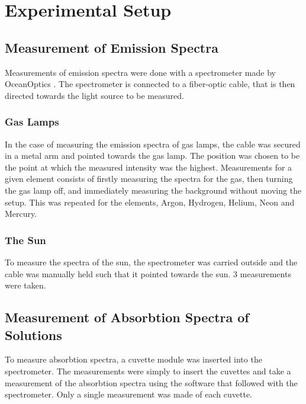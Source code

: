 \chapter{Experimental Setup}
\section{Measurement of Emission Spectra}
Measurements of emission spectra were done with a spectrometer made by OceanOptics \autocite{OcOptFlameManual2016}.
The spectrometer is connected to a fiber-optic cable, that is then directed towards the light source to be measured.
\subsection{Gas Lamps}
In the case of measuring the emission spectra of gas lamps\autocite{Frederiksen285570}, 
the cable was secured in a metal arm and pointed towards the gas lamp.
The position was chosen to be the point at which the measured intensity was the highest.
Measurements for a given element consists of firstly measuring the spectra for the gas, then turning the gas lamp off, 
and immediately measuring the background without moving the setup.
This was repeated for the elements, Argon, Hydrogen, Helium, Neon and Mercury.
\subsection{The Sun}
To measure the spectra of the sun, the spectrometer was carried outside and the cable was manually held such that it pointed towards the sun.
3 measurements were taken.
\section{Measurement of Absorbtion Spectra of Solutions}
To measure absorbtion spectra, a cuvette module\autocite{AbsorbtionModule} was inserted into the spectrometer. 
The measurements were simply to insert the cuvettes and take a measurement of the absorbtion spectra using the software that followed with the spectrometer.
Only a single measurement was made of each cuvette.
